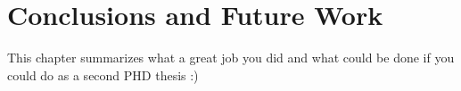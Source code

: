 \chapter{Conclusions and Future Work}
\label{ch:conclusion}

This chapter summarizes what a great job you did and what could be done if you could do as a second PHD thesis :)